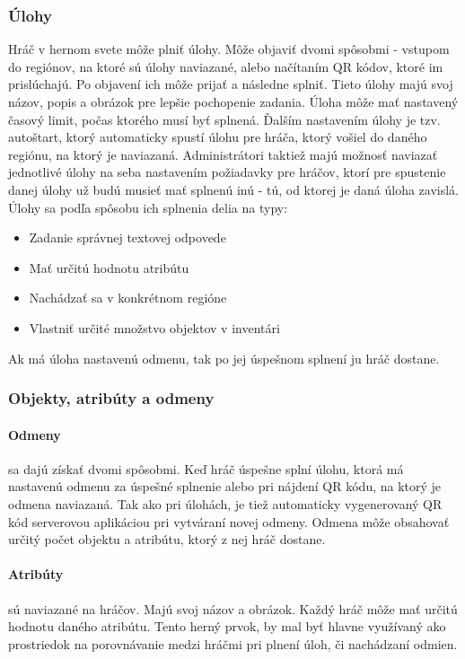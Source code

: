 \subsubsection{Úlohy}
Hráč v hernom svete môže plniť úlohy. Môže objaviť dvomi spôsobmi - vstupom do regiónov, na ktoré sú úlohy naviazané, alebo načítaním QR kódov, ktoré im prislúchajú. Po objavení ich môže prijať a následne splniť. Tieto úlohy majú svoj názov, popis a obrázok pre lepšie pochopenie zadania. Úloha môže mať nastavený časový limit, počas ktorého musí byť splnená. Ďalším nastavením úlohy je tzv. autoštart, ktorý automaticky spustí úlohu pre hráča, ktorý vošiel do daného regiónu, na ktorý je naviazaná. Administrátori taktiež majú možnosť naviazať jednotlivé úlohy na seba nastavením požiadavky pre hráčov, ktorí pre spustenie danej úlohy už budú musieť mať splnenú inú - tú, od ktorej je daná úloha zavislá. Úlohy sa podľa spôsobu ich splnenia delia na typy:
\begin{itemize}
	\item Zadanie správnej textovej odpovede
	\item Mať určitú hodnotu atribútu
	\item Nachádzať sa v konkrétnom regióne
	\item Vlastniť určité množstvo objektov v inventári
\end{itemize}
Ak má úloha nastavenú odmenu, tak po jej úspešnom splnení ju hráč dostane.


\subsubsection{Objekty, atribúty a odmeny}
\paragraph{Odmeny} sa dajú získať dvomi spôsobmi. Keď hráč úspešne splní úlohu, ktorá má nastavenú odmenu za úspešné splnenie alebo pri nájdení QR kódu, na ktorý je odmena naviazaná. Tak ako pri úlohách, je tiež automaticky vygenerovaný QR kód serverovou aplikáciou pri vytváraní novej odmeny. Odmena môže obsahovať určitý počet objektu a atribútu, ktorý z nej hráč dostane.

\paragraph{Atribúty} sú naviazané na hráčov. Majú svoj názov a obrázok. Každý hráč môže mať určitú hodnotu daného atribútu. Tento herný prvok, by mal byť hlavne využívaný ako prostriedok na porovnávanie medzi hráčmi pri plnení úloh, či nachádzaní odmien. 

